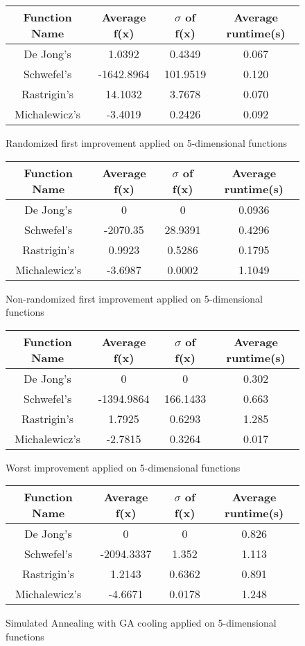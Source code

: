 \documentclass{article}
\begin{document}
\begin{figure}[H]
\begin{tabular}{|c||c|c|c|} \hline
	Function Name & Average f(x) & $\sigma$ of f(x) & Average runtime(s) \\ \hline \hline
	De Jong's & 1.0392 & 0.4349 & 0.067 \\ \hline
	Schwefel's & -1642.8964 & 101.9519 & 0.120 \\ \hline
	Rastrigin's & 14.1032 & 3.7678 & 0.070 \\ \hline
	Michalewicz's & -3.4019 & 0.2426 & 0.092 \\ \hline
\end{tabular}
\caption{Randomized first improvement applied on 5-dimensional functions}
\end{figure}

\begin{figure}[H]
    \begin{tabular}{|c||c|c|c|} \hline
        Function Name & Average f(x) & $\sigma$ of f(x) & Average runtime(s) \\ \hline \hline
        De Jong's & 0 & 0 & 0.0936 \\ \hline
        Schwefel's & -2070.35 & 28.9391 & 0.4296 \\ \hline
        Rastrigin's & 0.9923 & 0.5286 & 0.1795 \\ \hline
        Michalewicz's & -3.6987 & 0.0002 & 1.1049 \\ \hline
    \end{tabular}
    \caption{Non-randomized first improvement applied on 5-dimensional functions}
    \end{figure}

\begin{figure}[H]
\begin{tabular}{|c||c|c|c|} \hline
	Function Name & Average f(x) & $\sigma$ of f(x) & Average runtime(s) \\ \hline \hline
	De Jong's & 0 & 0 & 0.302 \\ \hline
	Schwefel's & -1394.9864 & 166.1433 & 0.663 \\ \hline
	Rastrigin's & 1.7925 & 0.6293 & 1.285 \\ \hline
	Michalewicz's & -2.7815 & 0.3264 & 0.017 \\ \hline
\end{tabular}
\caption{Worst improvement applied on 5-dimensional functions}
\end{figure}

\begin{figure}[H]
\begin{tabular}{|c||c|c|c|} \hline
	Function Name & Average f(x) & $\sigma$ of f(x) & Average runtime(s) \\ \hline \hline
	De Jong's & 0 & 0 & 0.826 \\ \hline
	Schwefel's & -2094.3337 & 1.352 & 1.113 \\ \hline
	Rastrigin's & 1.2143 & 0.6362 & 0.891 \\ \hline
	Michalewicz's & -4.6671 & 0.0178 & 1.248 \\ \hline
\end{tabular}
\caption{Simulated Annealing with GA cooling applied on 5-dimensional functions}
\end{figure}
\end{document}
